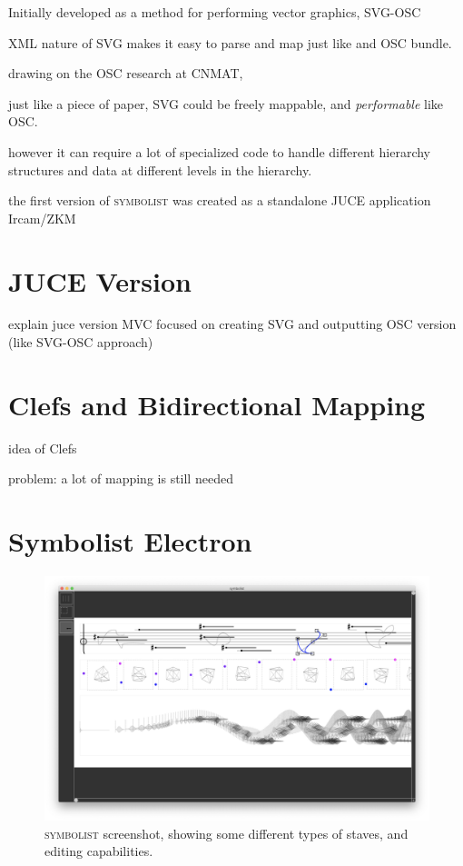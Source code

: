 \documentclass{article}
\def\symbolist{\textsc{symbolist}\xspace}
\begin{document}
Initially developed as a method for performing vector graphics, 
SVG-OSC

XML nature of SVG makes it easy to parse and map just like and OSC bundle.

drawing on the OSC research at CNMAT, 

just like a piece of paper, SVG could be freely mappable, and \textit{performable} like OSC.





however it can require a lot of specialized code to handle different hierarchy structures and data at different levels in the hierarchy.


the first version of \symbolist was created as a standalone JUCE application
Ircam/ZKM 

\section{JUCE Version}\label{sec:juce_version}

explain juce version
MVC
focused on creating SVG and outputting OSC version (like SVG-OSC approach)


\section{Clefs and Bidirectional Mapping}\label{sec:bidirectional_mapping}

idea of Clefs

problem:
a lot of mapping is still needed



\section{Symbolist Electron}\label{sec:symbolist_electron}

\begin{figure}[ht!]
\centering
\includegraphics[width=2\columnwidth]{symbolist.png}
\caption{ \symbolist screenshot, showing some different types of staves, and editing capabilities.
\label{fig:screenshot}}
\end{figure}
\end{document}
